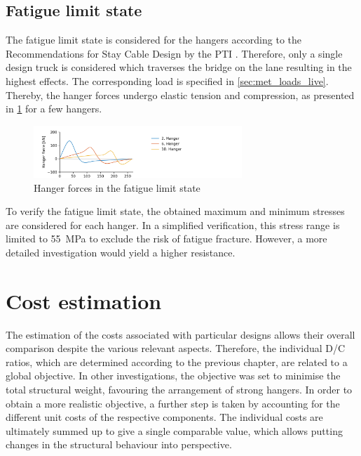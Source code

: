 \subsection{Fatigue limit state}\label{sec:fatigue}
The fatigue limit state is considered for the hangers according to the Recommendations for Stay Cable Design by the PTI \cite{PTI}. Therefore, only a single design truck is considered which traverses the bridge on the lane resulting in the highest effects. The corresponding load is specified in \cref{sec:met_loads_live}. Thereby, the hanger forces undergo elastic tension and compression, as presented in \cref{fig:fatigue_forces} for a few hangers. 

\begin{figure}[H]
    \centering
    \includegraphics[trim={0 0 5.5cm 0},clip, width=0.7\textwidth]{illustrations/figures/fatigue.png}
    \caption{Hanger forces in the fatigue limit state}
    \label{fig:fatigue_forces}
\end{figure}

To verify the fatigue limit state, the obtained maximum and minimum stresses are considered for each hanger. In a simplified verification, this stress range is limited to \SI{55}{MPa} to exclude the risk of fatigue fracture. However, a more detailed investigation would yield a higher resistance.

\section{Cost estimation} \label{sec:met_cost}
The estimation of the costs associated with particular designs allows their overall comparison despite the various relevant aspects. Therefore, the individual D/C ratios, which are determined according to the previous chapter, are related to a global objective. In other investigations, the objective was set to minimise the total structural weight, favouring the arrangement of strong hangers. In order to obtain a more realistic objective, a further step is taken by accounting for the different unit costs of the respective components. The individual costs are ultimately summed up to give a single comparable value, which allows putting changes in the structural behaviour into perspective. \medskip

